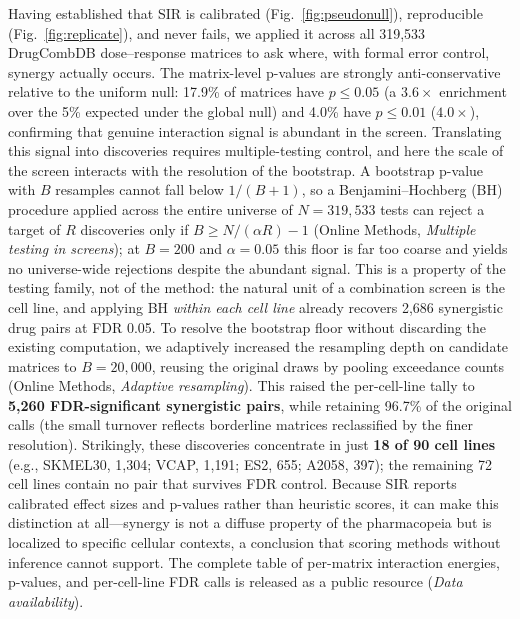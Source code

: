 \documentclass[pdflatex,sn-nature]{sn-jnl}%
\begin{document}
Having established that SIR is calibrated (Fig.~\ref{fig:pseudonull}), reproducible (Fig.~\ref{fig:replicate}), and never fails, we applied it across all 319{,}533 DrugCombDB dose--response matrices to ask where, with formal error control, synergy actually occurs.
The matrix-level p-values are strongly anti-conservative relative to the uniform null: 17.9\% of matrices have $p\le 0.05$ (a $3.6\times$ enrichment over the 5\% expected under the global null) and 4.0\% have $p\le 0.01$ ($4.0\times$), confirming that genuine interaction signal is abundant in the screen.
Translating this signal into discoveries requires multiple-testing control, and here the scale of the screen interacts with the resolution of the bootstrap.
A bootstrap p-value with $B$ resamples cannot fall below $1/(B+1)$, so a Benjamini--Hochberg (BH) procedure applied across the entire universe of $N=319{,}533$ tests can reject a target of $R$ discoveries only if $B \ge N/(\alpha R) - 1$ (Online Methods, \emph{Multiple testing in screens}); at $B=200$ and $\alpha=0.05$ this floor is far too coarse and yields no universe-wide rejections despite the abundant signal.
This is a property of the testing family, not of the method: the natural unit of a combination screen is the cell line, and applying BH \emph{within each cell line} already recovers 2{,}686 synergistic drug pairs at FDR 0.05.
To resolve the bootstrap floor without discarding the existing computation, we adaptively increased the resampling depth on candidate matrices to $B=20{,}000$, reusing the original draws by pooling exceedance counts (Online Methods, \emph{Adaptive resampling}).
This raised the per-cell-line tally to \textbf{5{,}260 FDR-significant synergistic pairs}, while retaining 96.7\% of the original calls (the small turnover reflects borderline matrices reclassified by the finer resolution).
Strikingly, these discoveries concentrate in just \textbf{18 of 90 cell lines} (e.g., SKMEL30, 1{,}304; VCAP, 1{,}191; ES2, 655; A2058, 397); the remaining 72 cell lines contain no pair that survives FDR control.
Because SIR reports calibrated effect sizes and p-values rather than heuristic scores, it can make this distinction at all---synergy is not a diffuse property of the pharmacopeia but is localized to specific cellular contexts, a conclusion that scoring methods without inference cannot support.
The complete table of per-matrix interaction energies, p-values, and per-cell-line FDR calls is released as a public resource (\emph{Data availability}).
\end{document}
